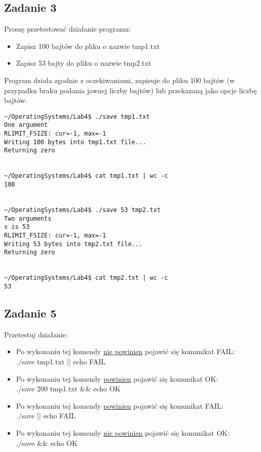 \documentclass[a4paper,15pt]{article}
\newcommand{\assignment}[2]{
    \begin{tcolorbox}[colback=black!5!white,colframe=black,title={Zadanie #1}]
        #2
    \end{tcolorbox}
}
\begin{document}
\subsection{Zadanie 3}
\assignment{}{Proszę przetestować działanie programu:
\begin{itemize}
\item Zapisz 100 bajtów do pliku o nazwie tmp1.txt
\item Zapisz 53 bajty do pliku o nazwie tmp2.txt
\end{itemize}
}
Program działa zgodnie z oczekiwaniami, zapisuje do pliku 100 bajtów (w przypadku braku podania jawnej liczby bajtów) lub przekazaną jako opcje liczbę bajtów. 
\begin{lstlisting}[style=CStyle, label=some-code, caption=Testowanie działania save.c]
~/OperatingSystems/Lab4$ ./save tmp1.txt
One argument
RLIMIT_FSIZE: cur=-1, max=-1
Writing 100 bytes into tmp1.txt file...
Returning zero


~/OperatingSystems/Lab4$ cat tmp1.txt | wc -c
100


~/OperatingSystems/Lab4$ ./save 53 tmp2.txt
Two arguments
s is 53
RLIMIT_FSIZE: cur=-1, max=-1
Writing 53 bytes into tmp2.txt file...
Returning zero


~/OperatingSystems/Lab4$ cat tmp2.txt | wc -c
53
\end{lstlisting}

\newpage
\subsection{Zadanie 5}
\assignment{5}{
Przetestuj działanie:
\begin{itemize}
\item Po wykonaniu tej komendy \underline{nie powinien} pojawić się komunikat FAIL: \\ ./save tmp1.txt || echo FAIL
\item Po wykonaniu tej komendy \underline{powinien} pojawić się komunikat OK: \\ ./save 200 tmp1.txt \&\& echo OK 
\item Po wykonaniu tej komendy \underline{powinien} pojawić się komunikat FAIL: \\ ./save || echo FAIL
\item Po wykonaniu tej komendy \underline{nie powinien} pojawić się komunikat OK: \\ ./save \&\& echo OK
\end{itemize}
}
\end{document}
